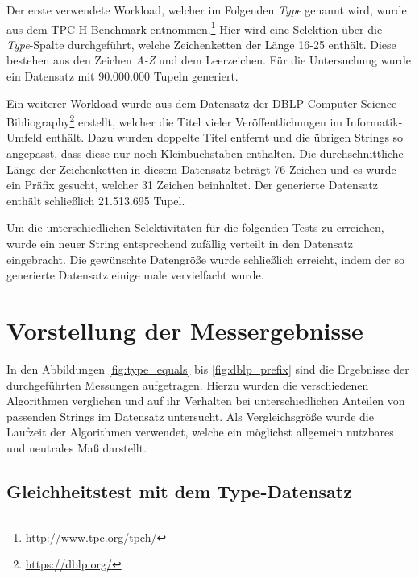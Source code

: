 Der erste verwendete Workload, welcher im Folgenden \emph{Type} genannt wird, wurde aus dem TPC-H-Benchmark entnommen.\footnote{\url{http://www.tpc.org/tpch/}}
Hier wird eine Selektion über die \emph{Type}-Spalte durchgeführt, welche Zeichenketten der Länge 16-25 enthält.
Diese bestehen aus den Zeichen \emph{A-Z} und dem Leerzeichen.
Für die Untersuchung wurde ein Datensatz mit 90.000.000 Tupeln generiert.

Ein weiterer Workload wurde aus dem Datensatz der DBLP Computer Science Bibliography\footnote{\url{https://dblp.org/}} erstellt, welcher die Titel vieler Veröffentlichungen im Informatik-Umfeld enthält.
Dazu wurden doppelte Titel entfernt und die übrigen Strings so angepasst, dass diese nur noch Kleinbuchstaben enthalten.
Die durchschnittliche Länge der Zeichenketten in diesem Datensatz beträgt 76 Zeichen und es wurde ein Präfix gesucht, welcher 31 Zeichen beinhaltet.
Der generierte Datensatz enthält schließlich 21.513.695 Tupel.

Um die unterschiedlichen Selektivitäten für die folgenden Tests zu erreichen, wurde ein neuer String entsprechend zufällig verteilt in den Datensatz eingebracht.
Die gewünschte Datengröße wurde schließlich erreicht, indem der so generierte Datensatz einige male vervielfacht wurde.

\section{Vorstellung der Messergebnisse}

In den Abbildungen \ref{fig:type_equals} bis \ref{fig:dblp_prefix} sind die Ergebnisse der durchgeführten Messungen aufgetragen.
Hierzu wurden die verschiedenen Algorithmen verglichen und auf ihr Verhalten bei unterschiedlichen Anteilen von passenden Strings im Datensatz untersucht.
Als Vergleichsgröße wurde die Laufzeit der Algorithmen verwendet, welche ein möglichst allgemein nutzbares und neutrales Maß darstellt.

\subsection{Gleichheitstest mit dem Type-Datensatz}

